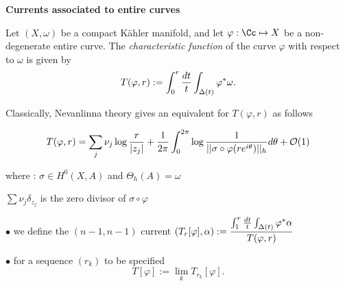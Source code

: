 \begin{slide}
\par\vspace{\bigskipamount}\noindent
{\large\bf Currents associated to entire curves}

\par\vspace{\bigskipamount}\noindent
Let $(X, \omega)$ be a compact K\"ahler manifold, and let $\varphi:{\Cc}\mapsto X$
be a non-degenerate entire curve. 
The {\sl characteristic function} of the curve $\varphi$ with respect to
$\omega$ is given by
$$
\displaystyle T(\varphi, r):=  
\int_0^r{{dt}\over {t}}\int_{\Delta(t)}\varphi^*\omega.$$

Classically, Nevanlinna theory gives an equivalent for $T(\varphi, r)$
as follows

$$T(\varphi, r)= \sum _j\nu_j\log{{r}\over {\vert z_j\vert }}+ 
{{1}\over {2\pi}}\int_0^{2\pi}\log{{1}\over {\vert \vert \sigma \circ \varphi (re^{i\theta})
\vert \vert _h}}
d\theta+ {\cal O}(1)$$

where : $\sigma\in H^0(X, A)$\hskip 0.3cm  and \hskip 0.3cm $\Theta_h(A)=\omega$

\hskip 1.3cm $\displaystyle \sum \nu_j\delta_{z_j}$ \hskip 0.2cm is the zero divisor of $\sigma \circ \varphi$

$\bullet$ we define the $(n- 1, n-1)$ current
$\displaystyle (T_r[\varphi], \alpha):= {{\int_1^r{{dt}\over {t}}\int_{\Delta(t)}\varphi^*\alpha}\over
{T(\varphi, r)}}$

$\bullet$ for a sequence $(r_k)$ to be specified
$$T[\varphi]:= \lim_kT_{r_k}[\varphi].$$
\end{slide}

